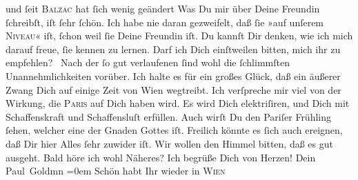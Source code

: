 \begin{ledgroupsized}[t]{13cm}
               und ſeit \textsc{Balzac} hat ſich wenig geändert{\dotsseven}\pend
           \pstart
           Was Du mir über Deine Freundin ſchreibſt, iſt ſehr ſchön. Ich habe nie daran gezweifelt, daß ſie
               »auf unſerem \textsc{Niveau}« iſt, ſchon weil ſie Deine Freundin iſt. Du kannſt Dir
               denken, wie ich mich darauf freue, ſie kennen zu lernen. Darf ich Dich einſtweilen
               bitten, mich ihr zu empfehlen? {\dotsfour}\pend
           \pstart
           Nach der ſo gut verlaufenen \label{K_L02805-11v}\label{K_L02805-11h} ſind wohl die ſchlimmſten Unannehmlichkeiten vorüber. Ich halte es für ein
               großes Glück, daß ein äußerer Zwang Dich auf einige Zeit von Wien wegtreibt. Ich verſpreche mir viel von der Wirkung, die \textsc{Paris} auf Dich haben
               wird. Es wird Dich elektriſiren, und Dich mit Schaffenskraft und Schaffensluſt
               erfüllen. Auch wirſt Du den Pariſer Frühling
               ſehen, welcher eine der Gnaden Gottes iſt.\pend
           \pstart
           Freilich könnte es ſich auch ereignen, daß Dir hier Alles ſehr zuwider iſt.\pend
           \pstart
           {\pb}Wir wollen den Himmel bitten, daß es gut
               ausgeht.\pend
           \pstart
           Bald höre ich wohl Näheres?\pend
           \pstart
           Ich begrüße Dich von Herzen!\pend
           \pstart
           Dein {\\[\baselineskip]}\spacefill\mbox{Paul Goldmn}\pend
           \leftskip=0em{}\pstart
           \noindent{}Schön habt Ihr wieder in \textsc{Wien}{ }\label{K_L02805-34v}
\end{ledgroupsized}
